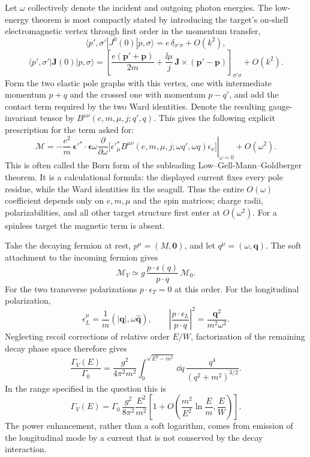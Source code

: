 \begin{enumerate}
Let \(\omega\) collectively denote the incident and outgoing photon
energies.  The low-energy theorem is most compactly stated by introducing
the target's on-shell electromagnetic vertex through first order in the
momentum transfer,
\[
 \langle p',\sigma'|J^0(0)|p,\sigma\rangle
   =e\,\delta_{\sigma'\sigma}+O(k^2),
\]
\[
 \langle p',\sigma'|\mathbf J(0)|p,\sigma\rangle
   =\left[\frac{e(\mathbf p'+\mathbf p)}{2m}
   +\frac{\ii\mu}{j}\,\mathbf J\times(\mathbf p'-\mathbf p)\right]_
   {\sigma'\sigma}+O(k^2).
\]
Form the two elastic pole graphs with this vertex, one with intermediate
momentum \(p+q\) and the crossed one with momentum \(p-q'\), and add the
contact term required by the two Ward identities.  Denote the resulting
gauge-invariant tensor by \(B^{\mu\nu}(e,m,\mu,j;q',q)\).  This gives the
following explicit prescription for the term asked for:
\[
 \boxed{\quad
 \mathcal M=
 -\frac{e^2}{m}\,
 \boldsymbol\epsilon'{}^*\!\cdot\boldsymbol\epsilon
 \left.
 \omega\frac{\partial}{\partial\omega}
 \bigl[\epsilon'{}_\mu^*B^{\mu\nu}
 (e,m,\mu,j;\omega q',\omega q)\epsilon_\nu\bigr]
 \right|_{\omega=0}
 +O(\omega^2).
 \quad}
\]
This is often called the Born form of the subleading Low--Gell-Mann--Goldberger
theorem.  It is a calculational formula: the displayed current fixes every
pole residue, while the Ward identities fix the seagull.  Thus the entire
\(O(\omega)\) coefficient depends only on \(e,m,\mu\) and the spin matrices;
charge radii, polarizabilities, and all other target structure first enter
at \(O(\omega^2)\).  For a spinless target the magnetic term is absent.

Take the decaying fermion at rest, \(p^\mu=(M,\mathbf0)\), and let
\(q^\mu=(\omega,\mathbf q)\).  The soft attachment to the incoming fermion
gives
\[
 \mathcal M_V\simeq g\,\frac{p\cdot\epsilon(q)}{p\cdot q}\,\mathcal M_0.
\]
For the two transverse polarizations \(p\cdot\epsilon_T=0\) at this order.
For the longitudinal polarization,
\[
 \epsilon_L^\mu=\frac1m(|\mathbf q|,\omega\widehat{\mathbf q}),\qquad
 \left|\frac{p\cdot\epsilon_L}{p\cdot q}\right|^2
 =\frac{\mathbf q^2}{m^2\omega^2}.
\]
Neglecting recoil corrections of relative order \(E/W\), factorization of
the remaining decay phase space therefore gives
\[
 \frac{\Gamma_V(E)}{\Gamma_0}
 =\frac{g^2}{4\pi^2m^2}\int_0^{\sqrt{E^2-m^2}}
 \dd q\,\frac{q^4}{(q^2+m^2)^{3/2}} .
\]
In the range specified in the question this is
\[
 \boxed{\quad
 \Gamma_V(E)=\Gamma_0\,\frac{g^2}{8\pi^2}\frac{E^2}{m^2}
 \left[1+O\left(\frac{m^2}{E^2}\ln\frac Em,\frac EW\right)\right].
 \quad}
\]
The power enhancement, rather than a soft logarithm, comes from emission of
the longitudinal mode by a current that is not conserved by the decay
interaction.


\end{enumerate}
